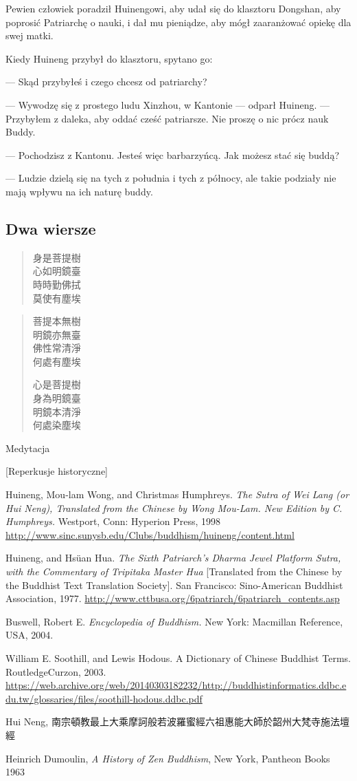 Pewien człowiek poradził Huinengowi, aby udał się do klasztoru Dongshan, aby poprosić Patriarchę o nauki, i dał mu pieniądze, aby mógł zaaranżować opiekę dla swej matki.

Kiedy Huineng przybył do klasztoru, spytano go:

--- Skąd przybyłeś i czego chcesz od patriarchy?

--- Wywodzę się z prostego ludu Xinzhou, w Kantonie --- odparł Huineng. --- Przybyłem z daleka, aby oddać cześć patriarsze. Nie proszę o nic prócz nauk Buddy.

--- Pochodzisz z Kantonu. Jesteś więc barbarzyńcą. Jak możesz stać się buddą?

--- Ludzie dzielą się na tych z południa i tych z północy, ale takie podziały nie mają wpływu na ich naturę buddy. 

\subsection{Dwa wiersze}

\begin{verse}
身是菩提樹\\
心如明鏡臺\\
時時勤佛拭\\
莫使有塵埃
\end{verse}

\begin{verse}
菩提本無樹\\
明鏡亦無臺\\
佛性常清淨\\
何處有塵埃

心是菩提樹\\
身為明鏡臺\\
明鏡本清淨\\
何處染塵埃
\end{verse}

Medytacja

[Reperkusje historyczne]


Huineng, Mou-lam Wong, and Christmas Humphreys. \emph{The Sutra of Wei Lang (or Hui Neng), Translated from the Chinese by Wong Mou-Lam. New Edition by C. Humphreys.} Westport, Conn: Hyperion Press, 1998 
\url{http://www.sinc.sunysb.edu/Clubs/buddhism/huineng/content.html}

Huineng, and Hsüan Hua. \emph{The Sixth Patriarch's Dharma Jewel Platform Sutra, with the Commentary of Tripitaka Master Hua} [Translated from the Chinese by the Buddhist Text Translation Society]. San Francisco: Sino-American Buddhist Association, 1977.
\url{http://www.cttbusa.org/6patriarch/6patriarch_contents.asp}

Buswell, Robert E. \emph{Encyclopedia of Buddhism.} New York: Macmillan Reference, USA, 2004. 

William E. Soothill, and Lewis Hodous. A Dictionary of Chinese Buddhist Terms. RoutledgeCurzon, 2003. \url{https://web.archive.org/web/20140303182232/http://buddhistinformatics.ddbc.edu.tw/glossaries/files/soothill-hodous.ddbc.pdf}

Hui Neng, 南宗頓教最上大乘摩訶般若波羅蜜經六祖惠能大師於韶州大梵寺施法壇經

Heinrich Dumoulin, \emph{A History of Zen Buddhism}, New York, Pantheon Books 1963